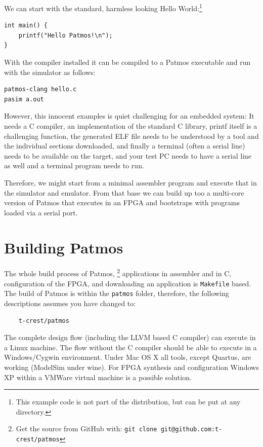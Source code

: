 \documentclass[a4paper,fontsize=10pt,twoside,DIV15,BCOR12mm,headinclude=true,footinclude=false,pagesize,bibtotoc]{scrbook}
\newcommand{\code}[1]{{\texttt{#1}}}
\begin{document}
We can start with the standard, harmless looking Hello
World:\footnote{This example code is not part of the distribution, but
can be put at any directory.}
\begin{lstlisting}
int main() {
    printf("Hello Patmos!\n");
}
\end{lstlisting}

With the compiler installed it can be compiled to a Patmos executable
and run with the simulator as follows:

\begin{verbatim}
patmos-clang hello.c
pasim a.out
\end{verbatim}

However, this innocent examples is quiet challenging for an embedded system:
It needs a C compiler, an implementation of the standard C library, printf
itself is a challenging function, the generated ELF file needs to be understood
by a tool and the individual sections downloaded, and finally a terminal (often
a serial line) needs to be available on the target, and your test PC needs to
have a serial line as well and a terminal program needs to run.

Therefore, we might start from a minimal assembler program and execute
that in the simulator and emulator. From that base we can build up too
a multi-core version of Patmos that executes in an FPGA and bootstraps
with programs loaded via a serial port.


\section{Building Patmos}

The whole build process of Patmos,%
\footnote{Get the source from GitHub with: \code{git clone git@github.com:t-crest/patmos}}
applications in assembler
and in C, configuration of the FPGA, and downloading an application
is \code{Makefile} based. The build of Patmos is within the \code{patmos} folder,
therefore, the following descriptions assumes you have changed to:

\begin{verbatim}
    t-crest/patmos
\end{verbatim}


The complete design flow (including the LLVM
based C compiler) can execute in a Linux machine. The flow without
the C compiler should be able to execute in a Windows/Cygwin environment.
Under Mac OS X all tools, except Quartus, are working (ModelSim under
wine). For FPGA synthesis and configuration Windows XP within a VMWare
virtual machine is a possible solution.
\end{document}
